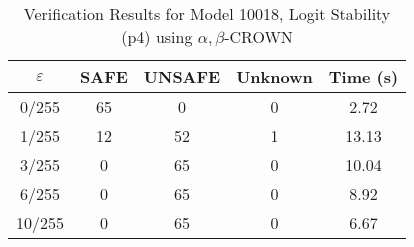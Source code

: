 \begin{table}[htbp]
\centering
\caption{Verification Results for Model 10018, Logit Stability (p4) using $\alpha,\beta$-CROWN}
\label{tab:model10018_p4_abcrown}
\begin{tabular}{|c|c|c|c|c|}
\hline
$\varepsilon$ & SAFE & UNSAFE & Unknown & Time (s) \\ \hline
0/255 & 65 & 0 & 0 & 2.72 \\ \hline
1/255 & 12 & 52 & 1 & 13.13 \\ \hline
3/255 & 0 & 65 & 0 & 10.04 \\ \hline
6/255 & 0 & 65 & 0 & 8.92 \\ \hline
10/255 & 0 & 65 & 0 & 6.67 \\ \hline
\end{tabular}
\end{table}
